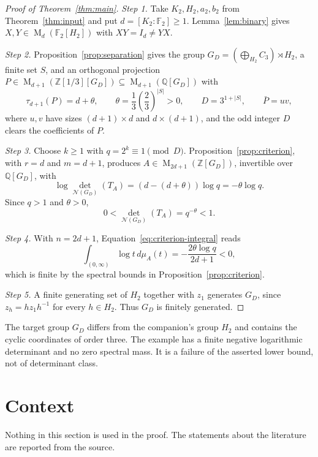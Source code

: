 \documentclass[11pt]{article}
\theoremstyle{remark}
\numberwithin{equation}{section}
\newcommand{\F}{\mathbb F}
\newcommand{\Z}{\mathbb Z}
\newcommand{\Q}{\mathbb Q}
\newcommand{\Mat}{\operatorname{M}}
\newcommand{\N}{\mathcal N}
\begin{document}
\begin{proof}[Proof of Theorem~\ref{thm:main}]
\emph{Step 1.} Take $K_2,H_2,a_2,b_2$ from Theorem~\ref{thm:input} and put $d=[K_2:\F_2]\ge1$. Lemma~\ref{lem:binary} gives $X,Y\in\Mat_d(\F_2[H_2])$ with $XY=I_d\ne YX$.

\emph{Step 2.} Proposition~\ref{prop:separation} gives the group $G_D=(\bigoplus_{H_2}C_3)\rtimes H_2$, a finite set $S$, and an orthogonal projection $P\in\Mat_{d+1}(\Z[1/3][G_D])\subseteq\Mat_{d+1}(\Q[G_D])$ with
\[
 \tau_{d+1}(P)=d+\theta,\qquad\theta=\frac13\left(\frac23\right)^{|S|}>0,
 \qquad D=3^{1+|S|},\qquad\bar P=uv,
\]
where $u,v$ have sizes $(d+1)\times d$ and $d\times(d+1)$, and the odd integer $D$ clears the coefficients of $P$.

\emph{Step 3.} Choose $k\ge1$ with $q=2^k\equiv1\pmod D$. Proposition~\ref{prop:criterion}, with $r=d$ and $m=d+1$, produces $A\in\Mat_{2d+1}(\Z[G_D])$, invertible over $\Q[G_D]$, with
\[
 \log\det_{\N(G_D)}(T_A)=(d-(d+\theta))\log q=-\theta\log q.
\]
Since $q>1$ and $\theta>0$,
\begin{equation}\label{eq:final-det}
 0<\det_{\N(G_D)}(T_A)=q^{-\theta}<1.
\end{equation}

\emph{Step 4.} With $n=2d+1$, Equation~\eqref{eq:criterion-integral} reads
\begin{equation}\label{eq:final-integral}
 \int_{(0,\infty)}\log t\,d\mu_A(t)
 =-\frac{2\theta\log q}{2d+1}<0,
\end{equation}
which is finite by the spectral bounds in Proposition~\ref{prop:criterion}.

\emph{Step 5.} A finite generating set of $H_2$ together with $z_1$ generates $G_D$, since $z_h=hz_1h^{-1}$ for every $h\in H_2$. Thus $G_D$ is finitely generated.
\end{proof}

The target group $G_D$ differs from the companion's group $H_2$ and contains the cyclic coordinates of order three. The example has a finite negative logarithmic determinant and no zero spectral mass. It is a failure of the asserted lower bound, not of determinant class.

\section{Context}
\label{sec:context}

Nothing in this section is used in the proof. The statements about the literature are reported from the source.
\end{document}
